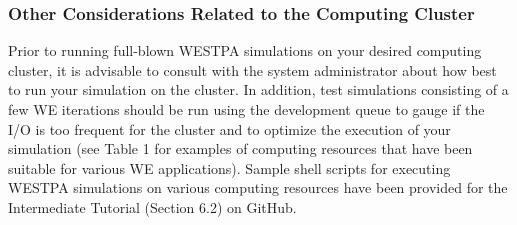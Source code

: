 \documentclass[9pt,tutorial]{livecoms}
\begin{document}
\subsubsection{Other Considerations Related to the Computing Cluster}

Prior to running full-blown WESTPA simulations on your desired computing cluster, it is advisable to consult with the system administrator about how best to run your simulation on the cluster. 
In addition, test simulations consisting of a few WE iterations should be run using the development queue to gauge if the I/O is too frequent for the cluster and to optimize the execution of your simulation (see Table 1 for examples of computing resources that have been suitable for various WE applications). 
Sample shell scripts for executing WESTPA simulations on various computing resources have been provided for the Intermediate Tutorial (Section 6.2) on GitHub. 
\end{document}
